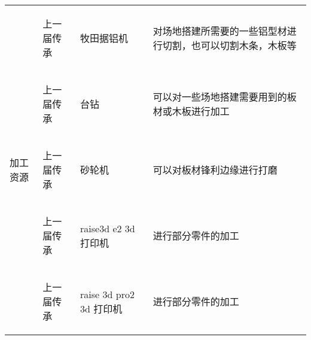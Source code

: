 \begin{longtable}{ X | X | X | X }
    \hline

        \multirow{10}{*}{加工资源} &
        \begin{center}
            上一届传承
        \end{center}&
        \begin{center}
            牧田据铝机
        \end{center}&
        \begin{center}
            对场地搭建所需要的一些铝型材进行切割，也可以切割木条，木板等
        \end{center}\\
    
    \cline{2-4}

        &
        \begin{center}
            上一届传承
        \end{center}&
        \begin{center}
            台钻
        \end{center}&
        \begin{center}
            可以对一些场地搭建需要用到的板材或木板进行加工
        \end{center}\\
    
    \cline{2-4}

    &
        \begin{center}
            上一届传承
        \end{center}&
        \begin{center}
            砂轮机
        \end{center}&
        \begin{center}
            可以对板材锋利边缘进行打磨
        \end{center}\\
    
    \cline{2-4}

    &
        \begin{center}
            上一届传承
        \end{center}&
        \begin{center}
            raise3d e2 3d 打印机
        \end{center}&
        \begin{center}
            进行部分零件的加工
        \end{center}\\
    
    \cline{2-4}

    &
        \begin{center}
            上一届传承
        \end{center}&
        \begin{center}
            raise 3d pro2 3d 打印机
        \end{center}&
        \begin{center}
            进行部分零件的加工
        \end{center}\\
    

\end{longtable}
